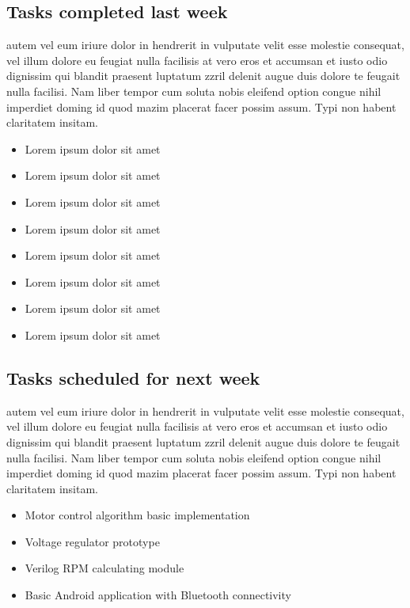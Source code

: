 \documentclass[12pt,journal]{IEEEtran}
\begin{document}
	\subsection{Tasks completed last week}
		autem vel eum iriure dolor in hendrerit in vulputate velit esse molestie consequat, vel illum dolore 
	eu feugiat nulla facilisis at vero eros et accumsan et iusto odio dignissim qui blandit praesent luptatum 
	zzril delenit augue duis dolore te feugait nulla facilisi. Nam liber tempor cum soluta nobis eleifend option 
	congue nihil imperdiet doming id quod mazim placerat facer possim assum. Typi non habent claritatem insitam.
	\begin{itemize}
		\item Lorem ipsum dolor sit amet
		\item Lorem ipsum dolor sit amet
		\item Lorem ipsum dolor sit amet
		\item Lorem ipsum dolor sit amet
		\item Lorem ipsum dolor sit amet
		\item Lorem ipsum dolor sit amet
		\item Lorem ipsum dolor sit amet
		\item Lorem ipsum dolor sit amet
	\end{itemize}

	\subsection{Tasks scheduled for next week}
	autem vel eum iriure dolor in hendrerit in vulputate velit esse molestie consequat, vel illum dolore 
	eu feugiat nulla facilisis at vero eros et accumsan et iusto odio dignissim qui blandit praesent luptatum 
	zzril delenit augue duis dolore te feugait nulla facilisi. Nam liber tempor cum soluta nobis eleifend option 
	congue nihil imperdiet doming id quod mazim placerat facer possim assum. Typi non habent claritatem insitam.
	\begin{itemize}
		\item Motor control algorithm basic implementation
		\item Voltage regulator prototype 
		\item Verilog RPM calculating module
		\item Basic Android application with Bluetooth connectivity
	\end{itemize}
\end{document}
